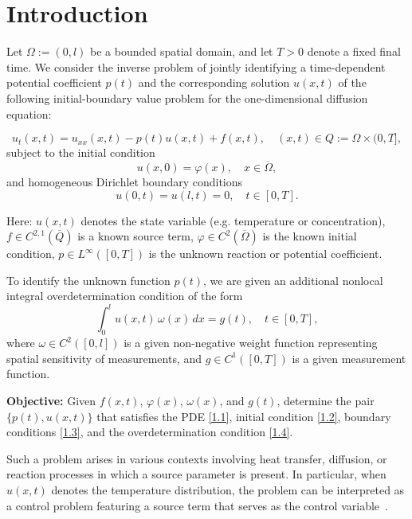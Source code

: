\documentclass[reqno]{amsart}
\begin{document}
\section{Introduction}\label{1}

Let \( \Omega := (0, l) \) be a bounded spatial domain, and let \( T > 0 \) denote a fixed final time. We consider the inverse problem of jointly identifying a time-dependent potential coefficient \( p(t) \) and the corresponding solution \( u(x,t) \) of the following initial-boundary value problem for the one-dimensional diffusion equation:

\begin{equation} \label{1.1}
    u_t(x,t) = u_{xx}(x,t) - p(t)u(x,t) + f(x,t), \quad (x,t) \in Q := \Omega \times (0,T],
\end{equation}
subject to the initial condition
\begin{equation} \label{1.2}
    u(x,0) = \varphi(x), \quad x \in \overline{\Omega},
\end{equation}
and homogeneous Dirichlet boundary conditions
\begin{equation} \label{1.3}
    u(0,t) = u(l,t) = 0, \quad t \in [0,T].
\end{equation}

Here:
\( u(x,t) \) denotes the state variable (e.g. temperature or concentration),
\( f \in C^{2,1}(\overline{Q}) \) is a known source term,
\( \varphi \in C^2(\overline{\Omega}) \) is the known initial condition,
\( p \in L^{\infty}([0,T]) \) is the unknown reaction or potential coefficient.

To identify the unknown function \( p(t) \), we are given an additional nonlocal  integral overdetermination condition of the form
\begin{equation} \label{1.4}
    \int_0^l u(x,t)\,\omega(x)\,dx = g(t), \quad t \in [0,T],
\end{equation}
where \( \omega \in C^2([0,l]) \) is a given non-negative weight function representing spatial sensitivity of measurements, and \( g \in C^1([0,T]) \) is a given measurement function.

\noindent
\textbf{Objective:} Given \( f(x,t) \), \( \varphi(x) \), \( \omega(x) \), and \( g(t) \), determine the pair \( \{p(t), u(x,t)\} \) that satisfies the PDE \eqref{1.1}, initial condition \eqref{1.2}, boundary conditions \eqref{1.3}, and the overdetermination condition \eqref{1.4}.

Such a problem arises in various contexts involving heat transfer, diffusion, or reaction processes in which a source parameter is present. In particular, when $u(x,t)$ denotes the temperature distribution, the problem can be interpreted as a control problem featuring a source term that serves as the control variable~\cite{Kamynin64, Ionkin77, Cannon86}. 
\end{document}
